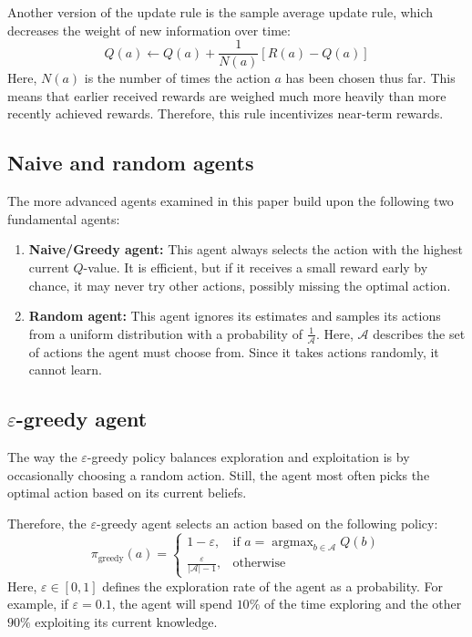 \documentclass[sigconf,nonacm]{acmart}
\newcommand{\argmax}{\mathop{\mathrm{argmax}}}
\begin{document}
Another version of the update rule is the sample average update rule, which decreases the weight of new information over time:
\begin{equation}
Q(a)\leftarrow Q(a) + \frac{1}{N(a)}[R(a) - Q(a)]
\end{equation}
Here, $N(a)$ is the number of times the action $a$ has been chosen thus far.
This means that earlier received rewards are weighed much more heavily than more recently achieved rewards. Therefore, this rule incentivizes near-term rewards.

\subsection{Naive and random agents}
The more advanced agents examined in this paper build upon the following two fundamental agents:
\begin{enumerate}
    \item \textbf{Naive/Greedy agent:} This agent always selects the action with the highest current $Q$-value. 
    It is efficient, but if it receives a small reward early by chance, it may never try other actions, possibly missing the optimal action.
    \item \textbf{Random agent:} This agent ignores its estimates and samples its actions from a uniform distribution with a probability of $\frac{1}{\mathcal{A}}$. 
    Here, $\mathcal{A}$ describes the set of actions the agent must choose from.
    Since it takes actions randomly, it cannot learn.
\end{enumerate}

\subsection{$\varepsilon$-greedy agent}
The way the $\varepsilon$-greedy policy balances exploration and exploitation is by occasionally choosing a random action. 
Still, the agent most often picks the optimal action based on its current beliefs.

Therefore, the $\varepsilon$-greedy agent selects an action based on the following policy:
\begin{equation}
    \pi_{\text{greedy}}(a) = 
    \begin{cases} 
    1 - \varepsilon, & \text{if } a=\argmax_{b\in\mathcal{A}}Q(b) \\
    \frac{\varepsilon}{|\mathcal{A}| - 1}, & \text{otherwise}
    \end{cases}
\end{equation}
Here, $\varepsilon\in[0,1]$ defines the exploration rate of the agent as a probability. 
For example, if $\varepsilon = 0.1$, the agent will spend $10\%$ of the time exploring and the other $90\%$ exploiting its current knowledge.
\end{document}
